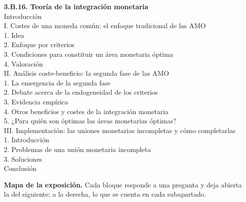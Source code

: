 \documentclass[11pt]{article}
\begin{document}
\begin{esquema}[unbreakable]
\textbf{3.B.16. Teoría de la integración monetaria}\\[2pt]
Introducción\\
I. Costes de una moneda común: el enfoque tradicional de las AMO\\
\hspace*{1.5em}1. Idea\\
\hspace*{1.5em}2. Enfoque por criterios\\
\hspace*{1.5em}3. Condiciones para constituir un área monetaria óptima\\
\hspace*{1.5em}4. Valoración\\
II. Análisis coste-beneficio: la segunda fase de las AMO\\
\hspace*{1.5em}1. La emergencia de la segunda fase\\
\hspace*{1.5em}2. Debate acerca de la endogeneidad de los criterios\\
\hspace*{1.5em}3. Evidencia empírica\\
\hspace*{1.5em}4. Otros beneficios y costes de la integración monetaria\\
\hspace*{1.5em}5. ¿Para quién son óptimas las áreas monetarias óptimas?\\
III. Implementación: las uniones monetarias incompletas y cómo completarlas\\
\hspace*{1.5em}1. Introducción\\
\hspace*{1.5em}2. Problemas de una unión monetaria incompleta\\
\hspace*{1.5em}3. Soluciones\\
Conclusión
\end{esquema}

\begin{anotaciones}
\textbf{Mapa de la exposición.} Cada bloque responde a una pregunta y deja abierta la del siguiente; a la derecha, lo que se cuenta en cada subapartado.
\begin{infografiacaja}
\caption{Mapa del tema: la pregunta de cada bloque, sus subapartados y el hilo que los une}\label{figu:mapa-tema}
\end{infografiacaja}
\end{anotaciones}
\end{document}
